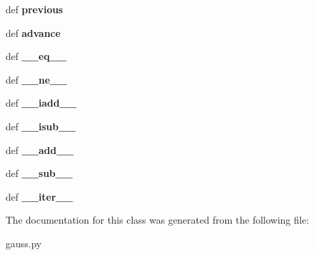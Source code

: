 \begin{DoxyCompactItemize}
\item 
\hypertarget{classgauss_1_1_swig_py_iterator_a0ab8f93d15be4df9cb46376b7511800f}{def {\bfseries previous}}\label{classgauss_1_1_swig_py_iterator_a0ab8f93d15be4df9cb46376b7511800f}

\item 
\hypertarget{classgauss_1_1_swig_py_iterator_a77fc7d33ddd90cb754ba1aa64aed343c}{def {\bfseries advance}}\label{classgauss_1_1_swig_py_iterator_a77fc7d33ddd90cb754ba1aa64aed343c}

\item 
\hypertarget{classgauss_1_1_swig_py_iterator_acd6ed78cd998a6ea63e11a84c8e1bf88}{def {\bfseries \-\_\-\-\_\-eq\-\_\-\-\_\-}}\label{classgauss_1_1_swig_py_iterator_acd6ed78cd998a6ea63e11a84c8e1bf88}

\item 
\hypertarget{classgauss_1_1_swig_py_iterator_a2c571886d797a7a0ee84b3882d95cb90}{def {\bfseries \-\_\-\-\_\-ne\-\_\-\-\_\-}}\label{classgauss_1_1_swig_py_iterator_a2c571886d797a7a0ee84b3882d95cb90}

\item 
\hypertarget{classgauss_1_1_swig_py_iterator_aef4225b0d737c73b97cfa50f76cc514f}{def {\bfseries \-\_\-\-\_\-iadd\-\_\-\-\_\-}}\label{classgauss_1_1_swig_py_iterator_aef4225b0d737c73b97cfa50f76cc514f}

\item 
\hypertarget{classgauss_1_1_swig_py_iterator_ae2857d1e0eec035ac4ffb692c98545e8}{def {\bfseries \-\_\-\-\_\-isub\-\_\-\-\_\-}}\label{classgauss_1_1_swig_py_iterator_ae2857d1e0eec035ac4ffb692c98545e8}

\item 
\hypertarget{classgauss_1_1_swig_py_iterator_ab9a0dddffef45af6aabf5521eb09b262}{def {\bfseries \-\_\-\-\_\-add\-\_\-\-\_\-}}\label{classgauss_1_1_swig_py_iterator_ab9a0dddffef45af6aabf5521eb09b262}

\item 
\hypertarget{classgauss_1_1_swig_py_iterator_a0f20786d2b32e39187068c621d82f528}{def {\bfseries \-\_\-\-\_\-sub\-\_\-\-\_\-}}\label{classgauss_1_1_swig_py_iterator_a0f20786d2b32e39187068c621d82f528}

\item 
\hypertarget{classgauss_1_1_swig_py_iterator_aa10a7f340340a932d2bfd838f27c4b7b}{def {\bfseries \-\_\-\-\_\-iter\-\_\-\-\_\-}}\label{classgauss_1_1_swig_py_iterator_aa10a7f340340a932d2bfd838f27c4b7b}

\end{DoxyCompactItemize}


The documentation for this class was generated from the following file\-:\begin{DoxyCompactItemize}
\item 
gauss.\-py\end{DoxyCompactItemize}
